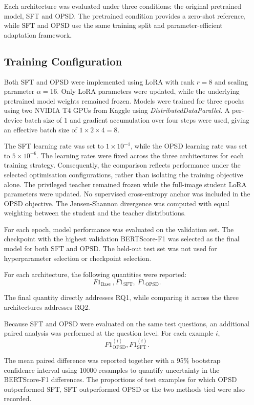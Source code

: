 Each architecture was evaluated under three conditions: the original pretrained model, SFT and OPSD.
The pretrained condition provides a zero-shot reference, while SFT and OPSD use the same training
split and parameter-efficient adaptation framework.

\subsection{Training Configuration}

Both SFT and OPSD were implemented using LoRA \parencite{hu2021lora} with rank $r=8$ and scaling
parameter $\alpha=16$. Only LoRA parameters were updated, while the underlying pretrained model
weights remained frozen. Models were trained for three epochs using two NVIDIA T4 GPUs from 
Kaggle using \emph{DistributedDataParallel}. A per-device batch size of 1 and gradient accumulation
over four steps were used, giving an effective batch size of $1 \times 2 \times 4 = 8$.

The SFT learning rate was set to $1\times10^{-4}$, while the OPSD learning rate was set to $5\times10^{-6}$. 
The learning rates were fixed across the three architectures for each training strategy.
Consequently, the comparison reflects performance under the selected optimisation configurations,
rather than isolating the training objective alone. The privileged teacher remained frozen
while the full-image student LoRA parameters were updated. No supervised cross-entropy anchor was included
in the OPSD objective. The Jensen-Shannon divergence was computed with equal weighting between the student
and the teacher distributions.

For each epoch, model performance was evaluated on the validation set. The checkpoint with the
highest validation BERTScore-F1 was selected as the final model for both SFT and OPSD. The held-out 
test set was not used for hyperparameter selection or checkpoint selection.

For each architecture, the following quantities were reported:
\[F1_{\mathrm{Base}}~, F1_{\mathrm{SFT}},~ F1_{\mathrm{OPSD}}.\]

The final quantity directly addresses RQ1, while comparing it across the three architectures
addresses RQ2.

Because SFT and OPSD were evaluated on the same test questions, an additional paired analysis was
performed at the question level. For each example $i$, 
\[F1^{(i)}_{\mathrm{OPSD}},
F1^{(i)}_{\mathrm{SFT}}.\]

The mean paired difference was reported together with a 95\% bootstrap confidence interval using
10000 resamples to quantify uncertainty in the BERTScore-F1 differences. The proportions of test examples for which OPSD outperformed SFT, SFT outperformed OPSD or 
the two methods tied were also recorded.

